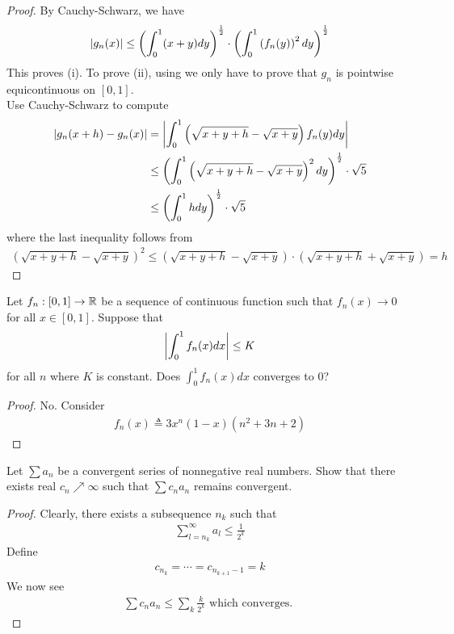 \documentclass{report}
\begin{document}
\begin{proof}
By Cauchy-Schwarz, we have 
\begin{align*}
\left|g_n(x)\right|\leq \left(\int_0^1 (x+y)dy \right)^{\frac{1}{2}} \cdot \left(\int_0^1 \left(f_n(y) \right)^2dy \right)^{\frac{1}{2}}
\end{align*}
This proves (i). To prove (ii), using  we only have to prove that $g_n$ is pointwise equicontinuous on $[0,1]$. \\

Use Cauchy-Schwarz to compute 
\begin{align*}
  \left|g_n(x+h)- g_n(x)\right| &= \left|\int_0^1 \left(\sqrt{x+y+h} -\sqrt{x+y}  \right) f_n(y)dy\right|  \\
  &\leq \left(\int_0^1 \left(\sqrt{x+y+h} - \sqrt{x+y}  \right)^2 dy \right) ^{\frac{1}{2}} \cdot \sqrt{5}  \\
  &\leq \left(\int_0^1 hdy \right)^{\frac{1}{2}}\cdot \sqrt{5} 
\end{align*}
where the last inequality follows from 
\begin{align*}
\left(\sqrt{x+y+h}- \sqrt{x+y}   \right)^{2} \leq \left(\sqrt{x+y+h}  - \sqrt{x+y}  \right) \cdot \left(\sqrt{x+y+h}  + \sqrt{x+y}  \right) = h
\end{align*}

\end{proof}
\begin{question}{}{}
Let $f_n:[0,1]\rightarrow \mathbb{R}$ be a sequence of continuous function such that $f_n(x)\rightarrow 0$ for all $x\in [0,1]$. Suppose that 
\begin{align*}
\left|\int_0^1 f_n(x)dx\right|\leq K
\end{align*}
for all $n$ where $K$ is constant. Does $\int_0^1 f_n(x)dx$ converges to $0$? 
\end{question}
\begin{proof}
No. Consider 
\begin{align*}
f_n(x)\triangleq 3x^n(1-x)(n^2+3n+2)
\end{align*}
\end{proof}
\begin{question}{}{}
Let $\sum a_n$ be a convergent series of nonnegative real numbers. Show that there exists real $c_n\nearrow \infty$ such that $\sum c_na_n$ remains convergent. 
\end{question}
\begin{proof}
Clearly, there exists a subsequence  $n_k$ such that 
\begin{align*}
\sum_{l=n_k}^{\infty} a_l \leq \frac{1}{2^k}
\end{align*}
Define 
\begin{align*}
c_{n_k}=\cdots = c_{n_{k+1}-1}= k
\end{align*}
We now see 
\begin{align*}
\sum c_na_n \leq \sum_k \frac{k}{2^k}\text{ which converges. }
\end{align*}
\end{proof}
\end{document}
